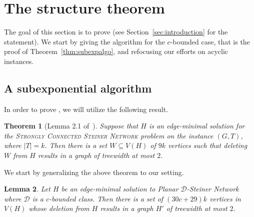 \documentclass[a4paper,11pt]{article}
\newcommand{\calD}{\mathcal{D}}
\theoremstyle{plain}
\newtheorem{theorem}{Theorem}[section]
\newtheorem{lemma}[theorem]{Lemma}
\newtheorem{identification rule}{Identification Rule}
\theoremstyle{definition}
\theoremstyle{remark}
\newcommand{\Dsnfull}{{\sc Planar $\calD$-Steiner Network}\xspace}
\begin{document}
\section{The structure theorem}

The goal of this section is to prove  (see Section~\ref{sec:introduction} for the statement). We start by giving the algorithm for the $c$-bounded case, that is the proof of Theorem~\ref{thm:subexpalgo}, and refocusing our efforts on acyclic instances.

\subsection{A subexponential algorithm}
\label{sec:dag}

In order to prove , we will utilize the following result.

\begin{theorem}[Lemma 2.1 of~\cite{ChitnisFHM20}]\label{thm:smalldeletion_scss}
Suppose that $H$ is an edge-minimal solution for the \textsc{Strongly Connected Steiner Network} problem on the instance $(G,T)$, where $|T|=k$. Then there is a set $W\subseteq V(H)$ of $9k$ vertices such that deleting $W$ from $H$ results in a graph of treewidth at most $2$.
\end{theorem}

We start by generalizing the above theorem to our setting.

\begin{lemma}\label{lem:smalldeletion}
Let $H$ be an edge-minimal solution to \Dsnfull where $\calD$ is a $c$-bounded class. Then there is a set of $(30c+29)k$ vertices in $V(H)$ whose deletion from $H$ results in a graph $H'$ of treewidth at most $2$.
\end{lemma}
\end{document}
